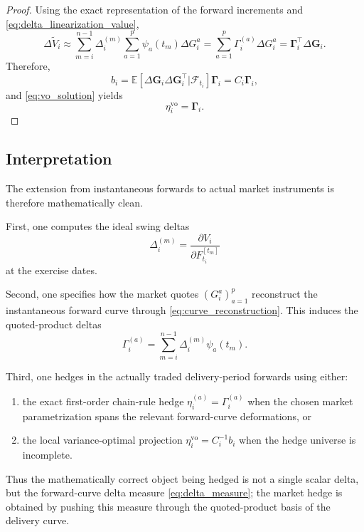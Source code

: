 \documentclass[10pt,a4paper,reqno]{amsart}
\newcommand{\<}{\langle}
\renewcommand{\>}{\rangle}
\theoremstyle{example}
\begin{document}
\begin{proof}
Using the exact representation of the forward increments and \eqref{eq:delta_linearization_value},
\[
\Delta \widetilde V_i
\approx
\sum_{m=i}^{n-1}
\Delta_i^{(m)}
\sum_{a=1}^p \psi_a(t_m)\Delta G_i^a
=
\sum_{a=1}^p
\Gamma_i^{(a)}\Delta G_i^a
=
\boldsymbol{\Gamma}_i^\top \Delta \mathbf{G}_i.
\]
Therefore,
\[
b_i
=
\mathbb{E}\!\left[
\Delta \mathbf{G}_i\Delta \mathbf{G}_i^\top
\Big|
\mathcal{F}_{t_i}
\right]
\boldsymbol{\Gamma}_i
=
C_i \boldsymbol{\Gamma}_i,
\]
and \eqref{eq:vo_solution} yields
\[
\eta_i^{\mathrm{vo}}=\boldsymbol{\Gamma}_i.
\]
\end{proof}

\subsection{Interpretation}

The extension from instantaneous forwards to actual market instruments is therefore mathematically clean.

First, one computes the ideal swing deltas
\[
\Delta_i^{(m)} = \frac{\partial V_i}{\partial F_{t_i}^{[t_m]}}
\]
at the exercise dates.

Second, one specifies how the market quotes $(G_i^a)_{a=1}^p$ reconstruct the instantaneous forward
curve through \eqref{eq:curve_reconstruction}. This induces the quoted-product deltas
\[
\Gamma_i^{(a)}
=
\sum_{m=i}^{n-1}
\Delta_i^{(m)}\psi_a(t_m).
\]

Third, one hedges in the actually traded delivery-period forwards using either:
\begin{enumerate}
    \item the exact first-order chain-rule hedge $\eta_i^{(a)}=\Gamma_i^{(a)}$ when the chosen market
    parametrization spans the relevant forward-curve deformations, or
    \item the local variance-optimal projection $\eta_i^{\mathrm{vo}}=C_i^{-1}b_i$ when the hedge
    universe is incomplete.
\end{enumerate}

Thus the mathematically correct object being hedged is not a single scalar delta, but the forward-curve
delta measure \eqref{eq:delta_measure}; the market hedge is obtained by pushing this measure through
the quoted-product basis of the delivery curve.


\end{document}

